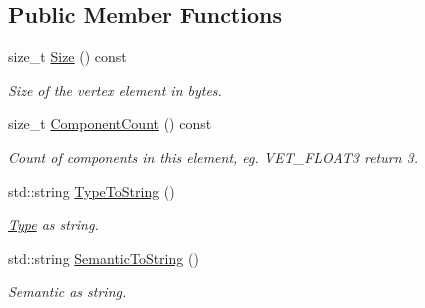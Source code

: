 \subsection*{Public Member Functions}
\begin{DoxyCompactItemize}
\item 
\hypertarget{class_assimp_1_1_ogre_1_1_vertex_element_ad4c81c0a83bc52fef381f8e6460245fd}{size\+\_\+t \hyperlink{class_assimp_1_1_ogre_1_1_vertex_element_ad4c81c0a83bc52fef381f8e6460245fd}{Size} () const }\label{class_assimp_1_1_ogre_1_1_vertex_element_ad4c81c0a83bc52fef381f8e6460245fd}

\begin{DoxyCompactList}\small\item\em Size of the vertex element in bytes. \end{DoxyCompactList}\item 
\hypertarget{class_assimp_1_1_ogre_1_1_vertex_element_a6e406d95ff8c387985fdddee298d52f5}{size\+\_\+t \hyperlink{class_assimp_1_1_ogre_1_1_vertex_element_a6e406d95ff8c387985fdddee298d52f5}{Component\+Count} () const }\label{class_assimp_1_1_ogre_1_1_vertex_element_a6e406d95ff8c387985fdddee298d52f5}

\begin{DoxyCompactList}\small\item\em Count of components in this element, eg. V\+E\+T\+\_\+\+F\+L\+O\+A\+T3 return 3. \end{DoxyCompactList}\item 
\hypertarget{class_assimp_1_1_ogre_1_1_vertex_element_a6a3996f713a559709249ad0c2a328f29}{std\+::string \hyperlink{class_assimp_1_1_ogre_1_1_vertex_element_a6a3996f713a559709249ad0c2a328f29}{Type\+To\+String} ()}\label{class_assimp_1_1_ogre_1_1_vertex_element_a6a3996f713a559709249ad0c2a328f29}

\begin{DoxyCompactList}\small\item\em \hyperlink{struct_type}{Type} as string. \end{DoxyCompactList}\item 
\hypertarget{class_assimp_1_1_ogre_1_1_vertex_element_a36b63671d34d57cd98d35edbbd7b4ab5}{std\+::string \hyperlink{class_assimp_1_1_ogre_1_1_vertex_element_a36b63671d34d57cd98d35edbbd7b4ab5}{Semantic\+To\+String} ()}\label{class_assimp_1_1_ogre_1_1_vertex_element_a36b63671d34d57cd98d35edbbd7b4ab5}

\begin{DoxyCompactList}\small\item\em Semantic as string. \end{DoxyCompactList}\end{DoxyCompactItemize}
